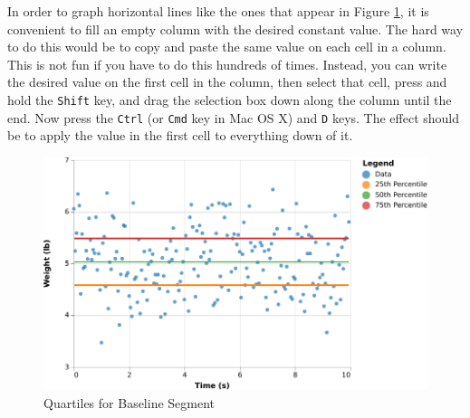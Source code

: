 In order to graph horizontal lines like the ones that appear in Figure \ref{figure:00.baseline.quartiles}, it is convenient to fill an empty column with the desired constant value. The hard way to do this would be to copy and paste the same value on each cell in a column. This is not fun if you have to do this hundreds of times. Instead, you can write the desired value on the first cell in the column, then select that cell, press and hold the \texttt{Shift} key, and drag the selection box down along the column until the end. Now press the \texttt{Ctrl} (or \texttt{Cmd} key in Mac OS X) and \texttt{D} keys. The effect should be to apply the value in the first cell to everything down of it. 
\begin{figure}
    \centering
    \includegraphics{chart/00-intro/baseline-quartiles.pdf}
    \caption{Quartiles for Baseline Segment}
    \label{figure:00.baseline.quartiles}
\end{figure}
